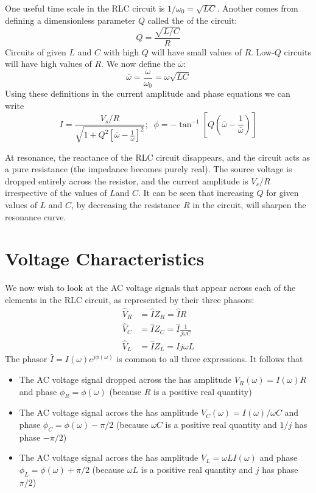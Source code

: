 One useful time scale in the RLC circuit is $1/\omega_0 = \sqrt{LC}$. Another comes from defining a dimensionless parameter $Q$ called the  of the circuit: \begin{equation*}
    Q = \frac{\sqrt{L/C}}{R}
\end{equation*}
Circuits of given $L$ and $C$ with high $Q$ will have small values of $R$. Low-$Q$ circuits will have high values of $R$. We now define the  $\overline{\omega}$: \begin{equation*}
    \overline{\omega} = \frac{\omega}{\omega_0} = \omega\sqrt{LC}
\end{equation*}
Using these definitions in the current amplitude and phase equations we can write \begin{equation*}
    I = \frac{V_s/R}{\sqrt{1+Q^2\left[\overline{\omega} - \frac{1}{\overline{\omega}}\right]^2}};\;\;\phi = -\tan^{-1}\left[Q\left(\overline{\omega} - \frac{1}{\overline{\omega}}\right)\right]
\end{equation*}

At resonance, the reactance of the RLC circuit disappears, and the circuit acts as a pure resistance (the impedance becomes purely real). The source voltage is dropped entirely across the resistor, and the current amplitude is $V_s/R$ irrespective of the values of $L$and $C$. It can be seen that increasing $Q$ for given values of $L$ and $C$, by decreasing the resistance $R$ in the circuit, will sharpen the resonance curve. 

\section{Voltage Characteristics}

We now wish to look at the AC voltage signals that appear across each of the elements in the RLC circuit, as represented by their three phasors: \begin{align*}
    \hat{V}_R &= \hat{I}Z_R = \hat{I}R \\
    \hat{V}_C &= \hat{I}Z_C = \hat{I}\frac{1}{j\omega C} \\
    \hat{V}_L &= \hat{I}Z_L = \hat{I}j\omega L
\end{align*}
The phasor $\hat{I} = I(\omega)e^{j\phi(\omega)}$ is common to all three expressions. It follows that \begin{itemize}
    \item The AC voltage signal dropped across the  has amplitude $V_R(\omega) = I(\omega)R$ and phase $\phi_R = \phi(\omega)$ (because $R$ is a positive real quantity)
    \item The AC voltage signal across the  has amplitude $V_C(\omega) = I(\omega)/\omega C$ and phase $\phi_C = \phi(\omega) - \pi/2$ (because $\omega C$ is a positive real quantity and $1/j$ has phase $-\pi/2$)
    \item The AC voltage signal across the  has amplitude $V_L = \omega LI(\omega)$ and phase $\phi_L = \phi(\omega) + \pi/2$ (because $\omega L$ is a positive real quantity and $j$ has phase $\pi/2$)
\end{itemize}

